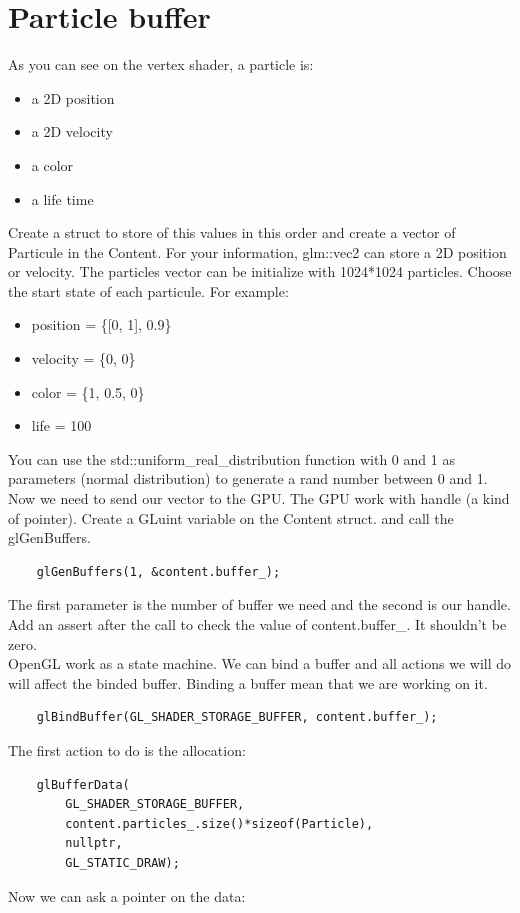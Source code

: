 \documentclass{article}
\begin{document}
\section{Particle buffer}
As you can see on the vertex shader, a particle is:
\begin{itemize}
	\item a 2D position
	\item a 2D velocity
	\item a color
	\item a life time
\end{itemize}
Create a struct to store of this values in this order and create a vector of Particule in the Content. For your information, glm::vec2 can store a 2D position or velocity. The particles vector can be initialize with 1024*1024 particles. Choose the start state of each particule. For example:
\begin{itemize}
	\item position = \{[0, 1], 0.9\}
	\item velocity = \{0, 0\}
	\item color = \{1, 0.5, 0\}
	\item life = 100
\end{itemize}
You can use the std::uniform\_real\_distribution function with 0 and 1 as parameters (normal distribution) to generate a rand number between 0 and 1.\\
Now we need to send our vector to the GPU. The GPU work with handle (a kind of pointer). Create a GLuint variable on the Content struct. and call the glGenBuffers.
\begin{lstlisting}
	glGenBuffers(1, &content.buffer_);
\end{lstlisting}
The first parameter is the number of buffer we need and the second is our handle. Add an assert after the call to check the value of content.buffer\_. It shouldn't be zero.\\
OpenGL work as a state machine. We can bind a buffer and all actions we will do will affect the binded buffer. Binding a buffer mean that we are working on it.
\begin{lstlisting}
	glBindBuffer(GL_SHADER_STORAGE_BUFFER, content.buffer_);
\end{lstlisting}
The first action to do is the allocation:
\begin{lstlisting}
	glBufferData(
		GL_SHADER_STORAGE_BUFFER,
		content.particles_.size()*sizeof(Particle),
		nullptr,
		GL_STATIC_DRAW);
\end{lstlisting}
Now we can ask a pointer on the data:
\end{document}
